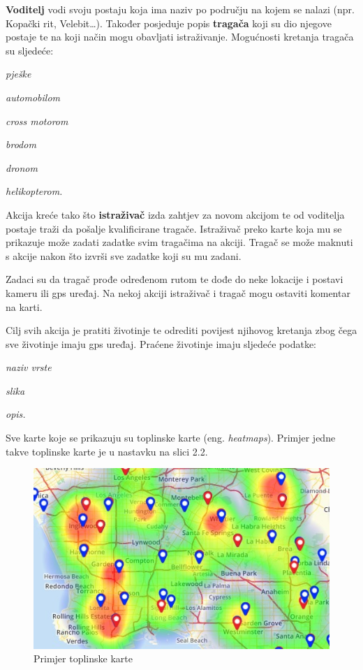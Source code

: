 		
		
		\textbf{Voditelj} vodi svoju postaju koja ima naziv po području na kojem se nalazi (npr. Kopački rit, Velebit…). Također posjeduje popis \textbf{tragača} koji su dio njegove postaje te na koji način mogu obavljati istraživanje. Mogućnosti kretanja tragača su sljedeće:
		\begin{packed_item}
			\item \textit{pješke}
			\item \textit{automobilom}
			\item \textit{cross motorom}
			\item \textit{brodom}
			\item \textit{dronom}
			\item \textit{helikopterom.}
		\end{packed_item}
		
		Akcija kreće tako što \textbf{istraživač} izda zahtjev za novom akcijom te od voditelja postaje traži da pošalje kvalificirane tragače. Istraživač preko karte koja mu se prikazuje može zadati zadatke svim tragačima na akciji. Tragač se može maknuti s akcije nakon što izvrši sve zadatke koji su mu zadani.
		
		Zadaci su da tragač prođe određenom rutom te dođe do neke lokacije i postavi kameru ili gps uređaj. Na nekoj akciji istraživač i tragač mogu ostaviti komentar na karti.
		
		Cilj svih akcija je pratiti životinje te odrediti povijest njihovog kretanja zbog čega sve životinje imaju gps uređaj. Praćene životinje imaju sljedeće podatke:
		\begin{packed_item}
			\item \textit{naziv vrste}
			\item \textit{slika}
			\item \textit{opis.}
		\end{packed_item}
		
		Sve karte koje se prikazuju su toplinske karte (eng. \textit{heatmaps}). Primjer jedne takve toplinske karte je u nastavku na slici 2.2.
		
		\begin{figure}[H]
			\includegraphics[scale=0.8]{slike/heatmap.JPG} %
			\centering
			\caption{Primjer toplinske karte}
			\label{fig:prkarte} %
		\end{figure}
		
